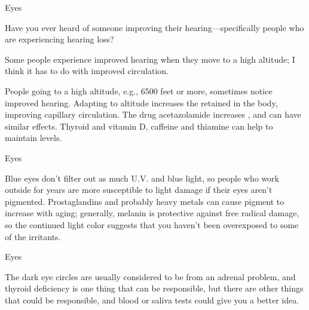 \documentclass[11pt,oneside,openany,extrafontsizes]{memoir}
\begin{document}
\begin{qaexchange}{Eyes}

    \begin{question}
        Have you ever heard of someone improving their hearing---specifically people who are experiencing hearing loss?
    \end{question}

    \begin{answer}
      Some people experience improved hearing when they move to a high altitude; I think it has to do with improved circulation.

      People going to a high altitude, e.g., 6500 feet or more, sometimes notice improved hearing. Adapting to altitude increases the  retained in the body, improving capillary circulation. The drug acetazolamide increases , and can have similar effects. Thyroid and vitamin D, caffeine and thiamine can help to maintain  levels.
    \end{answer}
\end{qaexchange}

\begin{standalonequote}{Eyes}

    \begin{answer}
      Blue eyes don't filter out as much U.V. and blue light, so people who work outside for years are more susceptible to light damage if their eyes aren't pigmented. Prostaglandins and probably heavy metals can cause pigment to increase with aging; generally, melanin is protective against free radical damage, so the continued light color suggests that you haven't been overexposed to some of the irritants.
    \end{answer}
\end{standalonequote}

\begin{standalonequote}{Eyes}

    \begin{answer}
      The dark eye circles are usually considered to be from an adrenal problem, and thyroid deficiency is one thing that can be responsible, but there are other things that could be responsible, and blood or saliva tests could give you a better idea.
    \end{answer}
\end{standalonequote}
\end{document}
